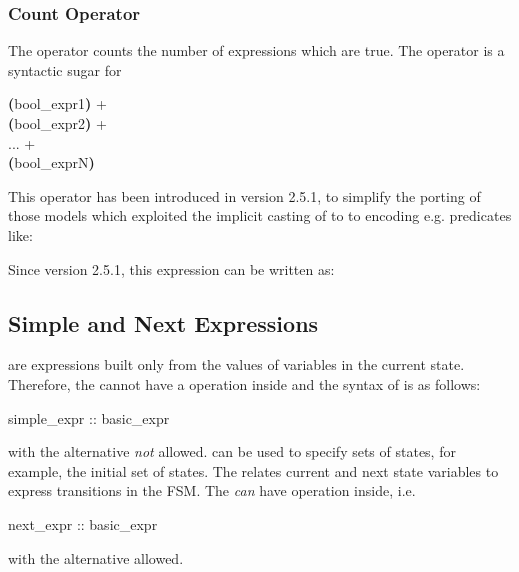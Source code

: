 \subsubsection{Count Operator}
\label{count operator}
The  operator counts the number of expressions
which are true. 
%
The  operator is a syntactic sugar for
\begin{Grammar}
     \textbf{(}bool_expr1\textbf{)} +\\
     \textbf{(}bool_expr2\textbf{)} +\\
     ... +\\
     \textbf{(}bool_exprN\textbf{)}
\end{Grammar}
%
This operator has been introduced in version 2.5.1, to simplify
the porting of those models which exploited the implicit casting
of \Integer to \Boolean to encoding e.g. predicates like:

%
Since version 2.5.1, this expression can be written as:



\subsection{Simple and Next Expressions}
\label{Simple and Next Expressions}

 are expressions built only from the
values of variables in the current state.
%
Therefore, the  cannot have a
 operation inside and the syntax of
 is as follows:
%
\begin{Grammar}
simple_expr :: basic_expr
\end{Grammar}
%
with the alternative  \emph{not}
allowed. 
%
 can be used to specify sets of states,
for example, the initial set of states.
%
The  relates current and next state
variables to express transitions in the FSM. 
%
The  \emph{can} have 
operation inside, i.e.
%
\begin{Grammar}
next_expr :: basic_expr
\end{Grammar}
%
with the alternative  allowed.
%
%


